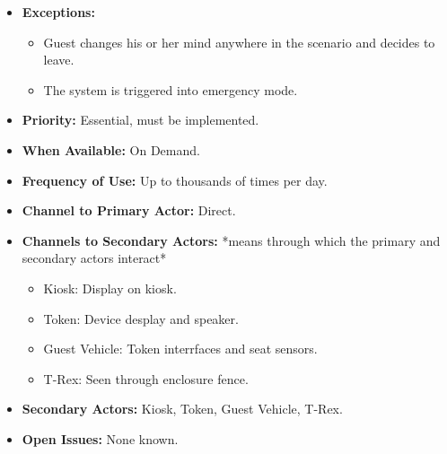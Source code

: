 \documentclass[12pt]{article}
\begin{document}
\begin{itemize}
        \item[]\textbf{Exceptions:}
            \begin{itemize}
                \item[] Guest changes his or her mind anywhere in the scenario and decides to leave.
                \item[] The system is triggered into emergency mode.
            \end{itemize}

        \item[]\textbf{Priority:}
            Essential, must be implemented.

        \item[]\textbf{When Available:}
            On Demand.

        \item[]\textbf{Frequency of Use:}
            Up to thousands of times per day.

        \item[]\textbf{Channel to Primary Actor:}
            Direct.

        \item[]\textbf{Channels to Secondary Actors:}
            *means through which the primary and secondary actors interact*
            \begin{itemize}
                \item[] Kiosk: Display on kiosk.
                \item[] Token: Device desplay and speaker.
                \item[] Guest Vehicle: Token interrfaces and seat sensors.
                \item[] T-Rex: Seen through enclosure fence.
            \end{itemize}
        \item[]\textbf{Secondary Actors:}
            Kiosk, Token, Guest Vehicle, T-Rex.

        \item[]\textbf{Open Issues:}
            None known.
    \end{itemize}
\end{document}
